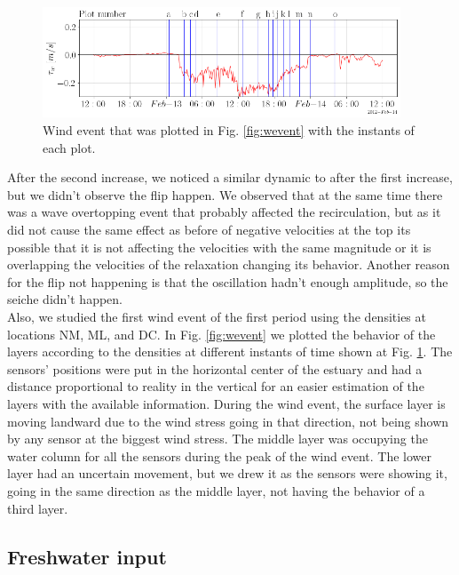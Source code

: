 \documentclass[tesis.tex]{subfiles}
\begin{document}
\newpage
\begin{figure}[h!]
    \centering
    \includegraphics[width=0.95\textwidth]{Imagenes/wind_event2.png}
    \caption{Wind event that was plotted in Fig. \ref{fig:wevent} with the instants of each plot. }
    \label{fig:wevent2}
\end{figure}

After the second increase, we noticed a similar dynamic to after the first increase, but we didn't observe the flip happen. We observed that at the same time there was a wave overtopping event that probably affected the recirculation, but as it did not cause the same effect as before of negative velocities at the top its possible that it is not affecting the velocities with the same magnitude or it is overlapping the velocities of the relaxation changing its behavior. Another reason for the flip not happening is that the oscillation hadn't enough amplitude, so the seiche didn't happen.\\

Also, we studied the first wind event of the first period using the densities at locations NM, ML, and DC. In Fig. \ref{fig:wevent} we plotted the behavior of the layers according to the densities at different instants of time shown at Fig. \ref{fig:wevent2}. The sensors' positions were put in the horizontal center of the estuary and had a distance proportional to reality in the vertical for an easier estimation of the layers with the available information. During the wind event, the surface layer is moving landward due to the wind stress going in that direction, not being shown by any sensor at the biggest wind stress. The middle layer was occupying the water column for all the sensors during the peak of the wind event. The lower layer had an uncertain movement, but we drew it as the sensors were showing it, going in the same direction as the middle layer, not having the behavior of a third layer.\\

\subsection{Freshwater input}
\end{document}
